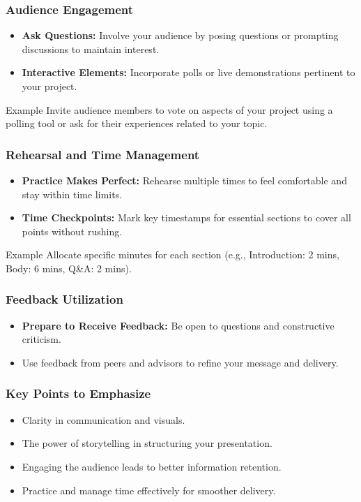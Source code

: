 \documentclass[aspectratio=169]{beamer}
\begin{document}
\begin{frame}[fragile]
    \frametitle{Audience Engagement}
    \begin{itemize}
        \item \textbf{Ask Questions:} Involve your audience by posing questions or prompting discussions to maintain interest.
        \item \textbf{Interactive Elements:} Incorporate polls or live demonstrations pertinent to your project.
    \end{itemize}

    \begin{block}{Example}
        Invite audience members to vote on aspects of your project using a polling tool or ask for their experiences related to your topic.
    \end{block}
\end{frame}

\begin{frame}[fragile]
    \frametitle{Rehearsal and Time Management}
    \begin{itemize}
        \item \textbf{Practice Makes Perfect:} Rehearse multiple times to feel comfortable and stay within time limits.
        \item \textbf{Time Checkpoints:} Mark key timestamps for essential sections to cover all points without rushing.
    \end{itemize}

    \begin{block}{Example}
        Allocate specific minutes for each section (e.g., Introduction: 2 mins, Body: 6 mins, Q\&A: 2 mins).
    \end{block}
\end{frame}

\begin{frame}[fragile]
    \frametitle{Feedback Utilization}
    \begin{itemize}
        \item \textbf{Prepare to Receive Feedback:} Be open to questions and constructive criticism.
        \item Use feedback from peers and advisors to refine your message and delivery.
    \end{itemize}
\end{frame}

\begin{frame}[fragile]
    \frametitle{Key Points to Emphasize}
    \begin{itemize}
        \item Clarity in communication and visuals.
        \item The power of storytelling in structuring your presentation.
        \item Engaging the audience leads to better information retention.
        \item Practice and manage time effectively for smoother delivery.
    \end{itemize}
\end{frame}
\end{document}
